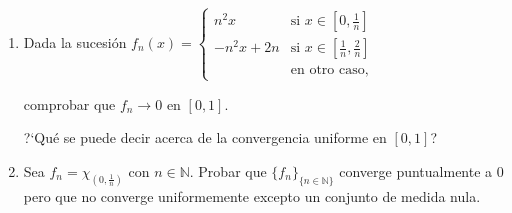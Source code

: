 \documentclass{book}
\newcommand{\nn}{\mathbb{N}}
\begin{document}


\begin{ejer} {}
\begin{enumerate} 
\item Dada la sucesión \;
$f_n(x)=\left\{
\begin{array}{cl}
n^2x &\mbox{si }x\in[0,\frac{1}{n}]
\\
-n^2x+2n &\mbox{si } x\in \left[\frac{1}{n},\frac{2}{n}\right] 
\\
&\mbox{en otro caso,}
\end{array}
\right.
$

comprobar que $f_n \to 0$ en $[0,1]$. 

?`Qué se puede decir acerca de la convergencia uniforme en $[0,1]$?
\item Sea $f_n=\chi_{(0,\frac{1}{n})}$ con $n\in\nn$. 
Probar que $\{f_n\}_{\{n\in\nn\}}$ converge puntualmente a $0$ pero que no converge uniformemente
excepto un conjunto de medida nula.
\end{enumerate}
\end{ejer}


\end{document}
